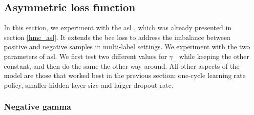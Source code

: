 \subsection{Asymmetric loss function} \label{supervised_approach_asymmetric}

In this section, we experiment with the \acrfull{asl} \cite{ben2020asymmetric}, which was already presented in section \ref{hmc_asl}. It extends the \acrfull{bce} loss to address the imbalance between positive and negative samples in multi-label settings. We experiment with the two parameters of \acrshort{asl}. We first test two different values for $\gamma_-$ while keeping the other constant, and then do the same the other way around. All other aspects of the model are those that worked best in the previous section: one-cycle learning rate policy, smaller hidden layer size and larger dropout rate.

\subsubsection{Negative gamma}

